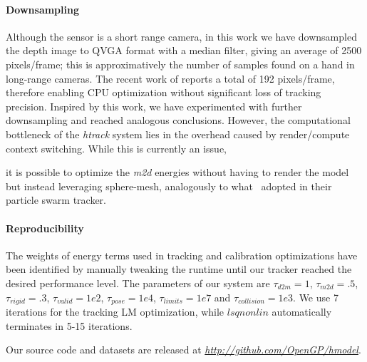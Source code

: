 \paragraph{Downsampling}
Although the \realsense{} sensor is a short range camera, in this work we have downsampled the depth image to QVGA format with a median filter, giving an average of 2500 pixels/frame; this is approximatively the number of samples found on a hand in long-range cameras. The recent work of \cite{taylor2016concerto} reports a total of 192 pixels/frame, therefore enabling CPU optimization without significant loss of tracking precision. Inspired by this work, we have experimented with further downsampling and reached analogous conclusions. However, the computational bottleneck of the \emph{htrack} system lies in the overhead caused by render/compute context switching. While this is currently an issue, 
\begin{draft}
it is possible to optimize the \emph{m2d} energies without  having to render the model but instead leveraging sphere-mesh, analogously to what~\cite{qian2014realtime} adopted in their particle swarm tracker.
\end{draft}

\paragraph{Reproducibility}
% 
The weights of energy terms used in tracking and calibration optimizations have been identified by manually tweaking the runtime until our tracker reached the desired performance level. 
The parameters of our system are $\tau_{d2m}=1$, $\tau_{m2d}=.5$, $\tau_{rigid}=.3$, $\tau_{valid}=1e2$, $\tau_{pose}=1e4$, $\tau_{limits}=1e7$ and $\tau_{collision}=1e3$. We use 7 iterations for the tracking LM optimization, while $lsqnonlin$ automatically terminates in 5-15 iterations. 
\begin{draft}
Our source code and datasets are released at \emph{\url{http://github.com/OpenGP/hmodel}}.
\end{draft}

